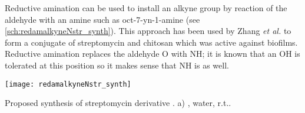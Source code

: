 Reductive amination can be used to install an alkyne group by reaction of the aldehyde with an amine such as oct-7-yn-1-amine  (see \ref{sch:redamalkyneNstr_synth}). This approach has been used by Zhang \textit{et al.}\cite{Zhang2013} to form a conjugate of streptomycin  and chitosan which was active against biofilms. 
Reductive amination replaces the aldehyde O with NH; it is known that an OH is tolerated at this position so it makes sense that NH is as well.

\begin{scheme}[H]
	\begin{center}
		\texttt{[image: redamalkyneNstr\_synth]}
		\caption{Proposed synthesis of streptomycin derivative . 
		a) , water, r.t..
		\label{sch:redamalkyneNstr_synth}}
	\end{center}
\end{scheme}
